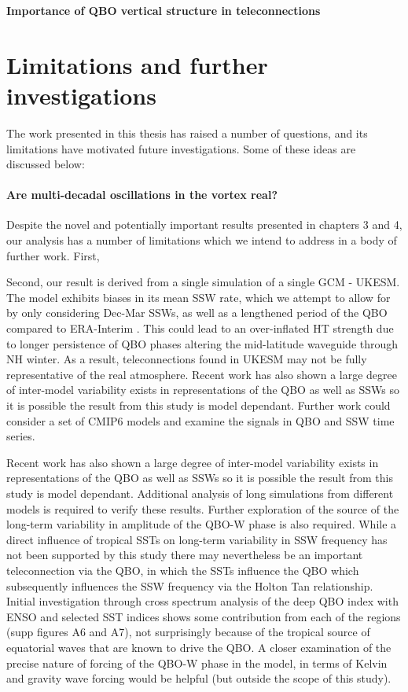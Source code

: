\textbf{Importance of QBO vertical structure in teleconnections}

\section{Limitations and further investigations}

The work presented in this thesis has raised a number of questions, and its limitations have motivated future investigations. Some of these ideas are
discussed below:

\paragraph{Are multi-decadal oscillations in the vortex real?}
Despite the novel and potentially important results presented in chapters 3 and 4, our analysis has a number of limitations which we intend to address in a body of further work. First,

Second, our result is derived from a single simulation of a single GCM - UKESM. The model exhibits biases in its mean SSW rate, which we attempt to allow for by only considering Dec-Mar SSWs, as well as a lengthened period of the QBO compared to ERA-Interim \citep{bushellEvaluation2020}. This could lead to an over-inflated HT strength due to longer persistence of QBO phases altering the mid-latitude waveguide through NH winter. As a result, teleconnections found in UKESM may not be fully representative of the real atmosphere. Recent work has also shown a large degree of inter-model variability exists in representations of the QBO as well as SSWs \citep{bushellEvaluation2020,ayarzaguenaUncertainty2020} so it is possible the result from this study is model dependant. Further work could consider a set of CMIP6 models and examine the signals in QBO and SSW time series. 

Recent work has also shown a large degree of inter-model variability exists in representations of the QBO as well as SSWs \citep{bushellEvaluation2020,ayarzaguenaUncertainty2020} so it is possible the result from this study is model dependant. Additional analysis of long simulations from different models is required to verify these results. 
Further exploration of the source of the long-term variability in amplitude of the QBO-W phase is also required. While a direct influence of tropical SSTs on long-term variability in SSW frequency has not been supported by this study there may nevertheless be an important teleconnection via the QBO, in which the SSTs influence the QBO which subsequently influences the SSW frequency via the Holton Tan relationship. Initial investigation through cross spectrum analysis of the deep QBO index with ENSO and selected SST indices shows some contribution from each of the regions (supp figures A6 and A7), not surprisingly because of the tropical source of equatorial waves that are known to drive the QBO. A closer examination of the precise nature of forcing of the QBO-W phase in the model, in terms of Kelvin and gravity wave forcing would be helpful (but outside the scope of this study).


